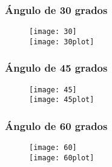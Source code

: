 \documentclass[a4paper]{article}
\begin{document}
\subsubsection{Ángulo de 30 grados}
\begin{figure}[H]
    \centering
    \texttt{[image: 30]} \\
    \texttt{[image: 30plot]}
  \end{figure} 

\subsubsection{Ángulo de 45 grados}
\begin{figure}[H]
    \centering
    \texttt{[image: 45]} \\
    \texttt{[image: 45plot]}
  \end{figure} 

\subsubsection{Ángulo de 60 grados}
\begin{figure}[H]
    \centering
    \texttt{[image: 60]} \\
    \texttt{[image: 60plot]}
  \end{figure} 
\end{document}
